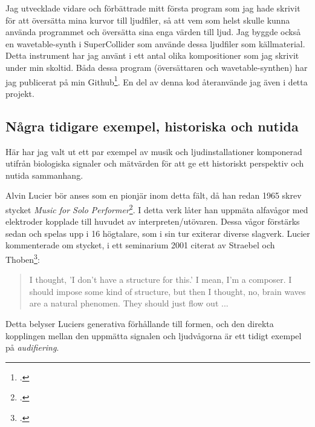 \documentclass[11pt, a4paper]{article} %
\begin{document}
Jag utvecklade vidare och förbättrade mitt första program som jag hade skrivit för att översätta mina kurvor till ljudfiler, så att vem som helst skulle kunna använda programmet och översätta sina enga värden till ljud. Jag byggde också en wavetable-synth i SuperCollider som använde dessa ljudfiler som källmaterial. Detta instrument har jag använt i ett antal olika kompositioner som jag skrivit under min skoltid. Båda dessa program (översättaren och wavetable-synthen) har jag publicerat på min Github\footcite{jondell_kj-jondelldiabetes-synth_2021}. En del av denna kod återanvände jag även i detta projekt.

\subsection*{Några tidigare exempel, historiska och nutida}
Här har jag valt ut ett par exempel av musik och ljudinstallationer komponerad utifrån biologiska signaler och mätvärden för att ge ett historiskt perspektiv och nutida sammanhang.

Alvin Lucier bör anses som en pionjär inom detta fält, då han redan 1965 skrev stycket \emph{Music for Solo Performer}\footcite{lucier_music_1965}. I detta verk låter han uppmäta alfavågor med elektroder kopplade till huvudet av interpreten/utövaren. Dessa vågor förstärks sedan och spelas upp i 16 högtalare, som i sin tur exiterar diverse slagverk. Lucier kommenterade om stycket, i ett seminarium 2001 citerat av Straebel och Thoben\footcite{straebel_alvin_2014}:

\begin{quote}
  I thought, 'I don't have a structure for this.' I mean, I'm a composer. I should impose some kind of structure, but then I thought, no, brain waves are a natural phenomen. They should just flow out ... 
\end{quote}

Detta belyser Luciers generativa förhållande till formen, och den direkta kopplingen mellan den uppmätta signalen och ljudvågorna är ett tidigt exempel på \emph{audifiering}.
\end{document}
